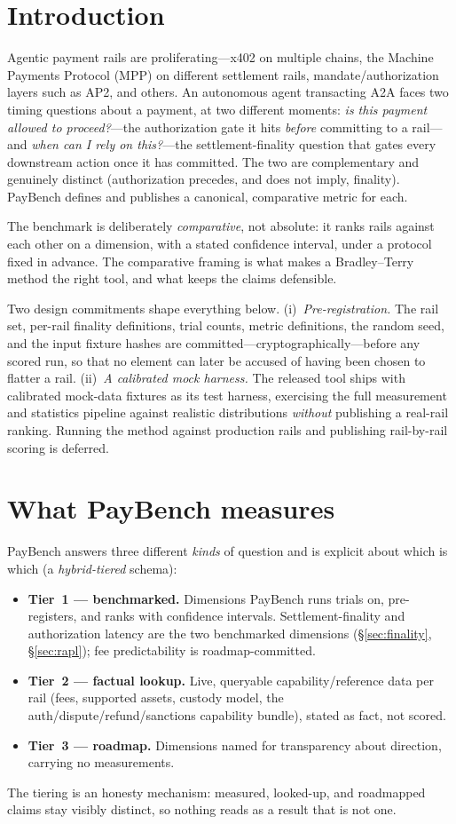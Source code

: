\documentclass[11pt]{article}
\begin{document}
\section{Introduction}
Agentic payment rails are proliferating---x402 on multiple chains, the Machine Payments Protocol (MPP)
on different settlement rails, mandate/authorization layers such as AP2, and others. An autonomous
agent transacting A2A faces two timing questions about a payment, at two different moments: \emph{is
this payment allowed to proceed?}---the authorization gate it hits \emph{before} committing to a
rail---and \emph{when can I rely on this?}---the settlement-finality question that gates every
downstream action once it has committed. The two are complementary and genuinely distinct
(authorization precedes, and does not imply, finality). PayBench defines and publishes a canonical,
comparative metric for each.

The benchmark is deliberately \emph{comparative}, not absolute: it ranks rails against each other on a
dimension, with a stated confidence interval, under a protocol fixed in advance. The comparative
framing is what makes a Bradley--Terry method the right tool, and what keeps the claims defensible.

Two design commitments shape everything below. (i)~\emph{Pre-registration.} The rail set, per-rail
finality definitions, trial counts, metric definitions, the random seed, and the input fixture hashes
are committed---cryptographically---before any scored run, so that no element can later be accused of
having been chosen to flatter a rail. (ii)~\emph{A calibrated mock harness.} The released tool ships
with calibrated mock-data fixtures as its test harness, exercising the full measurement and statistics
pipeline against realistic distributions \emph{without} publishing a real-rail ranking. Running the
method against production rails and publishing rail-by-rail scoring is deferred.

\section{What PayBench measures}
PayBench answers three different \emph{kinds} of question and is explicit about which is which (a
\emph{hybrid-tiered} schema):
\begin{itemize}
  \item \textbf{Tier~1 --- benchmarked.} Dimensions PayBench runs trials on, pre-registers, and ranks
  with confidence intervals. Settlement-finality and authorization latency are the two benchmarked
  dimensions (\S\ref{sec:finality}, \S\ref{sec:rapl}); fee predictability is roadmap-committed.
  \item \textbf{Tier~2 --- factual lookup.} Live, queryable capability/reference data per rail (fees,
  supported assets, custody model, the auth/dispute/refund/sanctions capability bundle), stated as
  fact, not scored.
  \item \textbf{Tier~3 --- roadmap.} Dimensions named for transparency about direction, carrying no
  measurements.
\end{itemize}
The tiering is an honesty mechanism: measured, looked-up, and roadmapped claims stay visibly distinct,
so nothing reads as a result that is not one.
\end{document}
